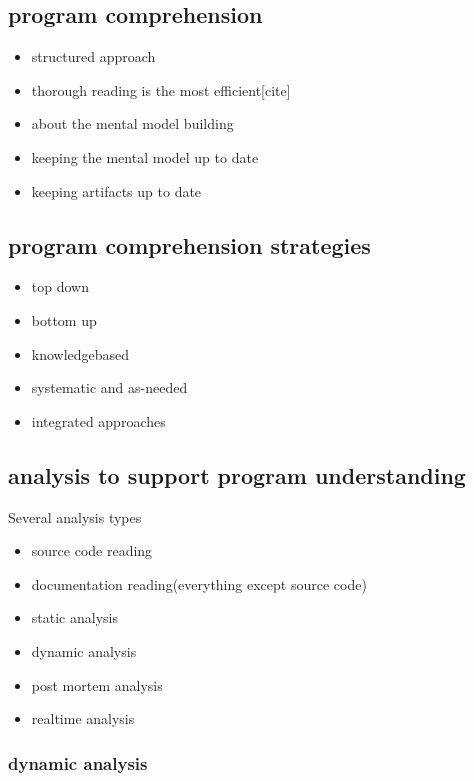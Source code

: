 \begin{itemize}
\subsection{program comprehension}

\begin{itemize}
\item structured approach
\item thorough reading is the most efficient[cite]
\item about the mental model building
\item keeping the mental model up to date
\item keeping artifacts up to date
\end{itemize}

\subsection{program comprehension strategies}

\begin{itemize}
\item top down
\item bottom up
\item knowledgebased
\item systematic and as-needed
\item integrated approaches
\end{itemize}

\subsection{analysis to support program understanding}

Several analysis types
\begin{itemize}
\item source code reading
\item documentation reading(everything except source code)
\item static analysis
\item dynamic analysis
\item post mortem analysis
\item realtime analysis
\end{itemize}

\subsubsection{dynamic analysis}


\end{itemize}
